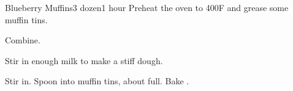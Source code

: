 \documentclass[../Cookbook.tex]{subfiles}
\begin{document}
\begin{recipe}[BlueberryMuffins]{Blueberry Muffins}{3 dozen}{1 hour}
    Preheat the oven to 400\0F and grease some muffin tins.

    Combine.
    
    Stir in enough milk to make a stiff dough.

    Stir in. Spoon into muffin tins, about  full. Bake .

\end{recipe}
\end{document}
